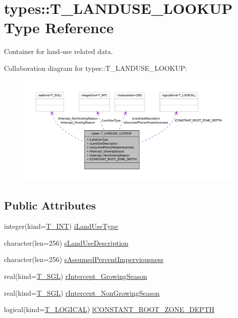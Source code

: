 \hypertarget{typetypes_1_1_t___l_a_n_d_u_s_e___l_o_o_k_u_p}{
\section{types::T\_\-LANDUSE\_\-LOOKUP Type Reference}
\label{typetypes_1_1_t___l_a_n_d_u_s_e___l_o_o_k_u_p}
}


Container for land-\/use related data.  




Collaboration diagram for types::T\_\-LANDUSE\_\-LOOKUP:\nopagebreak
\begin{figure}[H]
\begin{center}
\leavevmode
\includegraphics[width=400pt]{typetypes_1_1_t___l_a_n_d_u_s_e___l_o_o_k_u_p__coll__graph}
\end{center}
\end{figure}
\subsection*{Public Attributes}
\begin{DoxyCompactItemize}
\item 
integer(kind=\hyperlink{namespacetypes_a4e4d040a4425196c4d43be63e7e6103a}{T\_\-INT}) \hyperlink{typetypes_1_1_t___l_a_n_d_u_s_e___l_o_o_k_u_p_ab7443cbed68b298e42f0b4fb2c3f65d4}{iLandUseType}
\item 
character(len=256) \hyperlink{typetypes_1_1_t___l_a_n_d_u_s_e___l_o_o_k_u_p_a8e1c39432281c17b7b7b150acd90dea4}{sLandUseDescription}
\item 
character(len=256) \hyperlink{typetypes_1_1_t___l_a_n_d_u_s_e___l_o_o_k_u_p_ac1d94e0f8d2e258c2a9d97228701129e}{sAssumedPercentImperviousness}
\item 
real(kind=\hyperlink{namespacetypes_af3012489af4c138f271f1bce244b7e51}{T\_\-SGL}) \hyperlink{typetypes_1_1_t___l_a_n_d_u_s_e___l_o_o_k_u_p_a656493381912c76f42c21e501b27f9dc}{rIntercept\_\-GrowingSeason}
\item 
real(kind=\hyperlink{namespacetypes_af3012489af4c138f271f1bce244b7e51}{T\_\-SGL}) \hyperlink{typetypes_1_1_t___l_a_n_d_u_s_e___l_o_o_k_u_p_adfcfbb04a59c7d4ed9c98b5de555fd9e}{rIntercept\_\-NonGrowingSeason}
\item 
logical(kind=\hyperlink{namespacetypes_adfa8f4f6096bb7bdbb93f36b911dcaad}{T\_\-LOGICAL}) \hyperlink{typetypes_1_1_t___l_a_n_d_u_s_e___l_o_o_k_u_p_afe57d2ed9ca6c4e1f014f8cdfb969b24}{lCONSTANT\_\-ROOT\_\-ZONE\_\-DEPTH}
\end{DoxyCompactItemize}


